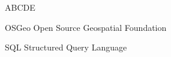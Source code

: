 
\begin{seznamzkratek}{ABCDE}

	      {OSGeo}
	      {Open Source Geospatial Foundation}

	      {SQL}
	      {Structured Query Language}

\end{seznamzkratek}